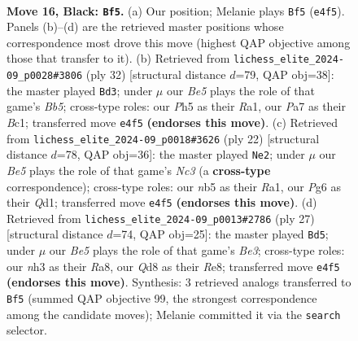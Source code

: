 \documentclass[11pt]{article}
\begin{document}
\clearpage

\begin{figure}[p]\centering
\begin{subfigure}{0.46\textwidth}\centering
\resizebox{\linewidth}{!}{%
\newchessgame
\chessboard[
  setfen={r2qk2r/ppp1b3/nn3pp1/1N1p3p/P2Pb3/1B2R2N/RPP2PPP/2BQ2K1 b kq - 9 16},
  showmover=false,
  pgfstyle=straightmove, color=movearrow, markmove={e4-f5}
]}
\caption{}
\end{subfigure}\hfill
\begin{subfigure}{0.46\textwidth}\centering
\resizebox{\linewidth}{!}{%
\newchessgame
\chessboard[
  setfen={r1b2rk1/1p4pp/pqnbpn2/1B1p4/P2P4/5NN1/1P3PPP/R1BQR1K1 w - - 0 17},
  showmover=false,
  pgfstyle=straightmove, color=movearrow, markmove={b5-d3}
]}
\caption{}
\end{subfigure}
\\[4pt]
\begin{subfigure}{0.46\textwidth}\centering
\resizebox{\linewidth}{!}{%
\newchessgame
\chessboard[
  setfen={r1bq1rk1/5pp1/p1n1pn1p/1pb5/3pPB2/P1NB1N1P/1PP2PP1/R2Q1RK1 w - - 0 12},
  showmover=false,
  pgfstyle=straightmove, color=movearrow, markmove={c3-e2}
]}
\caption{}
\end{subfigure}\hfill
\begin{subfigure}{0.46\textwidth}\centering
\resizebox{\linewidth}{!}{%
\newchessgame
\chessboard[
  setfen={r3r1k1/1ppq1ppp/1nnbb3/p3p1N1/6P1/PP1PP2P/1BQNBP2/R3K2R b KQ - 2 14},
  showmover=false,
  pgfstyle=straightmove, color=movearrow, markmove={e6-d5}
]}
\caption{}
\end{subfigure}
\caption{\textbf{Move 16, Black: \texttt{Bf5}.} (a) Our position; Melanie plays \texttt{Bf5} (\texttt{e4f5}). Panels (b)--(d) are the retrieved master positions whose correspondence most drove this move (highest QAP objective among those that transfer to it). (b) Retrieved from \texttt{lichess\_elite\_2024-09\_p0028\#3806} (ply 32) [structural distance $d$=79, QAP obj=38]: the master played \texttt{Bd3}; under $\mu$ our \emph{Be5} plays the role of that game's \emph{Bb5}; cross-type roles: our \emph{P}h5 as their \emph{R}a1, our \emph{P}a7 as their \emph{B}c1; transferred move \texttt{e4f5} \textbf{(endorses this move)}. (c) Retrieved from \texttt{lichess\_elite\_2024-09\_p0018\#3626} (ply 22) [structural distance $d$=78, QAP obj=36]: the master played \texttt{Ne2}; under $\mu$ our \emph{Be5} plays the role of that game's \emph{Nc3} (a \textbf{cross-type} correspondence); cross-type roles: our \emph{n}b5 as their \emph{R}a1, our \emph{P}g6 as their \emph{Q}d1; transferred move \texttt{e4f5} \textbf{(endorses this move)}. (d) Retrieved from \texttt{lichess\_elite\_2024-09\_p0013\#2786} (ply 27) [structural distance $d$=74, QAP obj=25]: the master played \texttt{Bd5}; under $\mu$ our \emph{Be5} plays the role of that game's \emph{Be3}; cross-type roles: our \emph{n}h3 as their \emph{R}a8, our \emph{Q}d8 as their \emph{R}e8; transferred move \texttt{e4f5} \textbf{(endorses this move)}. Synthesis: 3 retrieved analogs transferred to \texttt{Bf5} (summed QAP objective 99, the strongest correspondence among the candidate moves); Melanie committed it via the \texttt{search} selector.}
\label{fig:thought-m31}
\end{figure}
\end{document}
